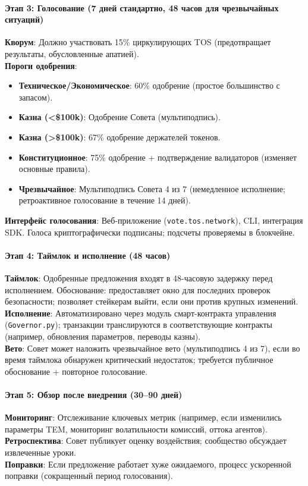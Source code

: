 \documentclass[11pt]{article}
\begin{document}
\paragraph{Этап 3: Голосование (7 дней стандартно, 48 часов для чрезвычайных ситуаций)}
\textbf{Кворум}: Должно участвовать 15\% циркулирующих TOS (предотвращает результаты, обусловленные апатией).\\
\textbf{Пороги одобрения}:
\begin{itemize}[noitemsep]
  \item \textbf{Техническое/Экономическое}: 60\% одобрение (простое большинство с запасом).
  \item \textbf{Казна (<\$100k)}: Одобрение Совета (мультиподпись).
  \item \textbf{Казна (>\$100k)}: 67\% одобрение держателей токенов.
  \item \textbf{Конституционное}: 75\% одобрение + подтверждение валидаторов (изменяет основные правила).
  \item \textbf{Чрезвычайное}: Мультиподпись Совета 4 из 7 (немедленное исполнение; ретроактивное голосование в течение 14 дней).
\end{itemize}
\textbf{Интерфейс голосования}: Веб-приложение (\texttt{vote.tos.network}), CLI, интеграция SDK. Голоса криптографически подписаны; подсчеты проверяемы в блокчейне.

\paragraph{Этап 4: Таймлок и исполнение (48 часов)}
\textbf{Таймлок}: Одобренные предложения входят в 48-часовую задержку перед исполнением. Обоснование: предоставляет окно для последних проверок безопасности; позволяет стейкерам выйти, если они против крупных изменений.\\
\textbf{Исполнение}: Автоматизировано через модуль смарт-контракта управления (\texttt{Governor.py}); транзакции транслируются в соответствующие контракты (например, обновления параметров, переводы казны).\\
\textbf{Вето}: Совет может наложить чрезвычайное вето (мультиподпись 4 из 7), если во время таймлока обнаружен критический недостаток; требуется публичное обоснование + повторное голосование.

\paragraph{Этап 5: Обзор после внедрения (30--90 дней)}
\textbf{Мониторинг}: Отслеживание ключевых метрик (например, если изменились параметры TEM, мониторинг волатильности комиссий, оттока агентов).\\
\textbf{Ретроспектива}: Совет публикует оценку воздействия; сообщество обсуждает извлеченные уроки.\\
\textbf{Поправки}: Если предложение работает хуже ожидаемого, процесс ускоренной поправки (сокращенный период голосования).
\end{document}
